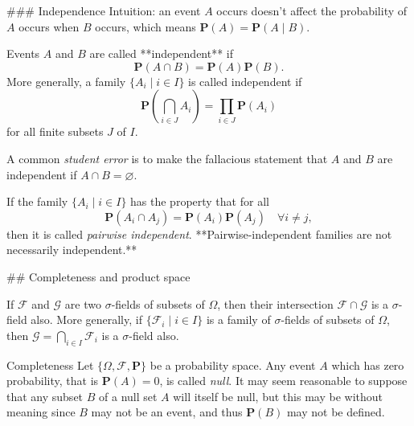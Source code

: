 ### Independence
Intuition: an event $A$ occurs doesn't affect the probability of $A$ occurs when $B$ occurs, which means $\mathbf{P}(A) = \mathbf{P}(A\;\vert\; B)$.

\begin{definition}
Events $A$ and $B$ are called **independent** if 
\begin{equation*}
    \mathbf{P}(A \cap B) = \mathbf{P}(A) \mathbf{P}(B).
\end{equation*}
More generally, a family $\{A_i \;\vert\; i \in I\}$ is called independent if
\begin{equation*}
    \mathbf{P} \left( \bigcap_{i \in J} A_i \right) = \prod_{i\in J} \mathbf{P}(A_i)
\end{equation*}
for all finite subsets $J$ of $I$. 
\end{definition}

\begin{caution}
A common \emph{student error} is to make the fallacious statement that $A$ and $B$ are independent if $A \cap B = \varnothing$.
\end{caution}

\begin{remark}
If the family $\{A_i \;\vert\; i \in I\}$ has the property that 
for all 
\begin{equation*}
    \mathbf{P}(A_i \cap A_j) = \mathbf{P}(A_i) \mathbf{P}(A_j) \quad \forall i\neq j, 
\end{equation*}
then it is called \emph{pairwise independent}. **Pairwise-independent families are not necessarily independent.** 
\end{remark}

## Completeness and product space
\begin{lemma}
If $\mathcal{F}$ and $\mathcal{G}$ are two $\sigma$-fields of subsets of $\Omega$, then their intersection $\mathcal{F} \cap \mathcal{G}$ is a $\sigma$-field also. More generally, if $\{ \mathcal{F}_i \;\vert\;  i \in I \}$ is a family of $\sigma$-fields of subsets of $\Omega$, then $\mathcal{G} = \bigcap_{i\in I} \mathcal{F}_i $ is a $\sigma$-field also. 
\end{lemma}

\begin{newnotion}{Completeness}
Let $\{\Omega, \mathcal{F}, \mathbf{P}\}$ be a probability space. Any event $A$ which has zero probability, that is $\mathbf{P}(A) = 0$, is called \emph{null}. It may seem reasonable to suppose that any subset $B$ of a null set $A$ will itself be null, but this may be without meaning since $B$ may not be an event, and thus $\mathbf{P}(B)$ may not be defined. 
\end{newnotion}


